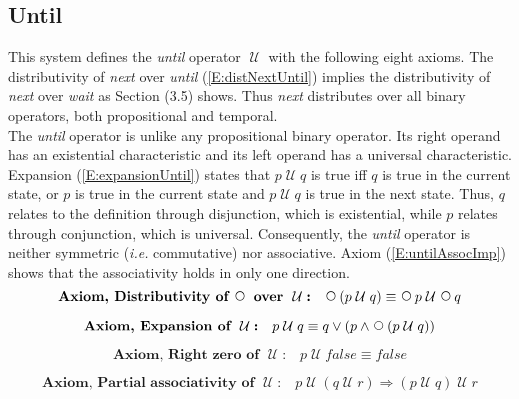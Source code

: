 \documentclass[fleqn, leqno]{article}
\newcommand{\impl}{\ensuremath{\Rightarrow}}        %
\newcommand{\Until}{\;\mathcal{U}\;}
\newcommand{\Next}{\;\,\text{\raisebox{3.5pt}{\circle{6}}}}
\newcommand{\firstspacer}{\vspace{-26pt}}
\begin{document}

\subsection{Until}

This system defines the \textit{until} operator $\Until$ with the following eight axioms.
The distributivity of \textit{next} over \textit{until} (\ref{E:distNextUntil}) implies the distributivity of \textit{next} over \textit{wait} as Section (3.5) shows.
Thus \textit{next} distributes over all binary operators, both propositional and temporal.\\

The \textit{until} operator is unlike any propositional binary operator.
Its right operand has an existential characteristic and its left operand has a universal characteristic.
Expansion (\ref{E:expansionUntil}) states that
$p\Until q$ is true iff $q$ is true in the current state, or $p$ is true in the current state and $p\Until q$ is
true in the next state.
Thus, $q$ relates to the definition through disjunction, which is existential,
while $p$ relates through conjunction, which is universal.
Consequently, the \textit{until} operator is neither symmetric (\textit{i.e.} commutative) nor associative.
Axiom (\ref{E:untilAssocImp}) shows that the associativity holds in only one direction.
\begin{equation}\label{E:distNextUntil}
\textbf{Axiom, Distributivity of $\Next$ over $\Until$:}\quad \Next (p \Until q) \equiv \Next p \Until \Next q
\end{equation}

\firstspacer

\begin{equation}\label{E:expansionUntil}
\textbf{Axiom, Expansion of $\Until$:}\quad p \Until q \equiv q \lor (p \land \Next (p \Until q))
\end{equation}

\firstspacer

\begin{equation}\label{E:untilFalse}
\textbf{Axiom, Right zero of $\Until$:}\quad p \Until false \equiv false
\end{equation}

\firstspacer

\begin{equation}\label{E:untilAssocImp}
\textbf{Axiom, Partial associativity of $\Until$:}\quad p \Until (q \Until r) \impl (p \Until q) \Until r
\end{equation}
\end{document}
